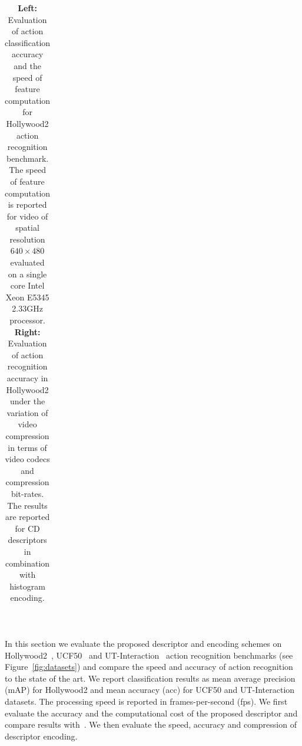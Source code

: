 \documentclass[10pt,twocolumn,letterpaper]{article}
\begin{document}
\begin{table}[t!]
\begin{center}
\begin{tabular}{p{}p{}}
\end{tabular}
\mbox{}\vspace{.1cm}\\
\caption{{\bf Left:} Evaluation of action classification accuracy and the speed of feature computation for Hollywood2 action recognition benchmark. The speed of feature computation is reported for video of spatial resolution $640\times480$ evaluated on a single core Intel Xeon E5345 2.33GHz processor.
{\bf Right:} Evaluation of action recognition accuracy in Hollywood2 under the variation of video compression in terms of video codecs and compression bit-rates. The results are reported for CD descriptors in combination with histogram encoding.
\vspace{-.4cm}}
\label{tab:HWD2}
\end{center}
\end{table}


In this section we evaluate the proposed descriptor and encoding schemes on Hollywood2~\cite{Marszalek09}, UCF50~\cite{Reddy12} and UT-Interaction~\cite{Ryoo10} action recognition benchmarks (see Figure~\ref{fig:datasets}) and compare the speed and accuracy of action recognition  to the state of the art. We report classification results as mean average precision (mAP) for Hollywood2 and mean accuracy (acc) for UCF50 and UT-Interaction datasets. The processing speed is reported in frames-per-second (fps). We first evaluate the accuracy and the computational cost of the proposed descriptor and compare results with~\cite{Wang12}. We then evaluate the speed, accuracy and compression of descriptor encoding.

\end{document}
